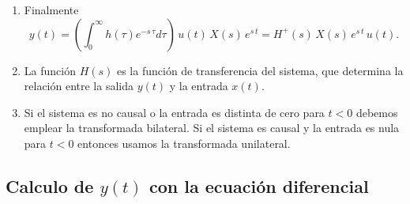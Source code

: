 \begin{enumerate}
	\item Finalmente
	\begin{equation}
		y(t) =
		\left(\int_{0}^{\infty }h\left(\tau\right) e^{- s \, \tau} d\tau\right) \, u(t) \, X(s) \, e^{s \, t}= 
		H^{+}(s) \, X(s) \, e^{s \, t} \, u(t).
		\label{laplaceunilateral}
	\end{equation}
	
	\item La función $H(s)$ es la función de transferencia del sistema, que determina la relación entre la salida $y(t)$ y la entrada $x(t)$.
	
	\item Si el sistema es no causal o la entrada es distinta de cero para $t < 0$ debemos emplear la transformada bilateral. Si el sistema es causal y la entrada es nula para $t < 0$ entonces usamos la transformada unilateral.
\end{enumerate}

\subsection{Calculo de $y(t)$ con la ecuación diferencial}

